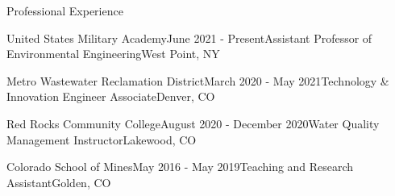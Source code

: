 \documentclass{resume} %
\begin{document}

\begin{rSection}{Professional Experience}

\begin{rSubsection}{United States Military Academy}{June 2021 - Present}{Assistant Professor of Environmental Engineering}{West Point, NY}
\end{rSubsection}


\begin{rSubsection}{Metro Wastewater Reclamation District}{March 2020 - May 2021}{Technology \& Innovation Engineer Associate}{Denver, CO}
\end{rSubsection}


\begin{rSubsection}{Red Rocks Community College}{August 2020 - December 2020}{Water Quality Management Instructor}{Lakewood, CO}
\end{rSubsection}


\begin{rSubsection}{Colorado School of Mines}{May 2016 - May 2019}{Teaching and Research Assistant}{Golden, CO}
\end{rSubsection}


\\


\end{rSection}
\end{document}

